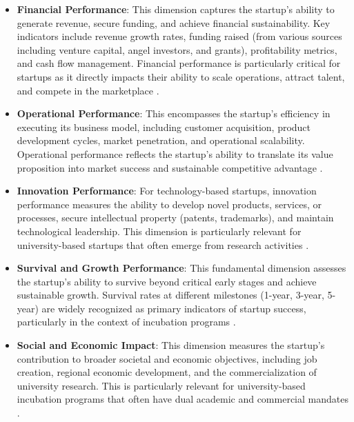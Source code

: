 \documentclass[../Main.tex]{subfiles}
\begin{document}
\begin{itemize}
    \item \textbf{Financial Performance}: This dimension captures the startup's ability to generate revenue, secure funding, and achieve financial sustainability. Key indicators include revenue growth rates, funding raised (from various sources including venture capital, angel investors, and grants), profitability metrics, and cash flow management. Financial performance is particularly critical for startups as it directly impacts their ability to scale operations, attract talent, and compete in the marketplace \cite{bruneel2010funding, lerner2018venture}.
    
    \item \textbf{Operational Performance}: This encompasses the startup's efficiency in executing its business model, including customer acquisition, product development cycles, market penetration, and operational scalability. Operational performance reflects the startup's ability to translate its value proposition into market success and sustainable competitive advantage \cite{spigel2017relational}.
    
    \item \textbf{Innovation Performance}: For technology-based startups, innovation performance measures the ability to develop novel products, services, or processes, secure intellectual property (patents, trademarks), and maintain technological leadership. This dimension is particularly relevant for university-based startups that often emerge from research activities \cite{siegel2003assessing}.
    
    \item \textbf{Survival and Growth Performance}: This fundamental dimension assesses the startup's ability to survive beyond critical early stages and achieve sustainable growth. Survival rates at different milestones (1-year, 3-year, 5-year) are widely recognized as primary indicators of startup success, particularly in the context of incubation programs \cite{NBIA2012, ubi2019world}.
    
    \item \textbf{Social and Economic Impact}: This dimension measures the startup's contribution to broader societal and economic objectives, including job creation, regional economic development, and the commercialization of university research. This is particularly relevant for university-based incubation programs that often have dual academic and commercial mandates \cite{grimaldi2005university}.
\end{itemize}
\end{document}

